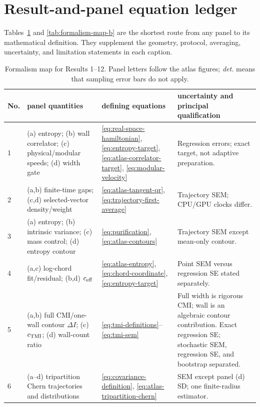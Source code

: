 \documentclass[aps,prb,twocolumn,floatfix,nofootinbib,superscriptaddress]{revtex4-2}
\begin{document}
\section{Result-and-panel equation ledger}
\label{app:equation-ledger}

Tables~\ref{tab:formalism-map-a} and \ref{tab:formalism-map-b} are the shortest route from
any panel to its mathematical definition.  They supplement the geometry, protocol,
averaging, uncertainty, and limitation statements in each caption.

\begin{table}[p]
\centering
\caption{\label{tab:formalism-map-a}Formalism map for Results 1--12.  Panel letters follow
the atlas figures; \emph{det.} means that sampling error bars do not apply.}
\footnotesize
\setlength{\tabcolsep}{3.2pt}
\renewcommand{\arraystretch}{1.08}
\begin{tabularx}{\textwidth}{p{}p{}Xp{}}
\toprule
No. & panel quantities & defining equations & uncertainty and principal qualification\\
\midrule
1 & (a) entropy; (b) wall correlator; (c) physical/modular speeds; (d) width gate
& \eqref{eq:real-space-hamiltonian}, \eqref{eq:entropy-target},
\eqref{eq:atlas-correlator-target}, \eqref{eq:modular-velocity}
& Regression errors; exact target, not adaptive preparation.\\
2 & (a,b) finite-time gaps; (c,d) selected-vector density/weight
& \eqref{eq:atlas-tangent-qr}, \eqref{eq:trajectory-first-average}
& Trajectory SEM; CPU/GPU clocks differ.\\
3 & (a) entropy; (b) intrinsic variance; (c) mass control; (d) entropy contour
& \eqref{eq:purification}, \eqref{eq:atlas-contours}
& Trajectory SEM except mean-only contour.\\
4 & (a,c) log-chord fit/residual; (b,d) $c_{\rm eff}$
& \eqref{eq:atlas-entropy}, \eqref{eq:chord-coordinate}, \eqref{eq:entropy-target}
& Point SEM versus regression SE stated separately.\\
5 & (a,b) full CMI/one-wall contour $\Delta I$; (c) $c_{\rm TMI}$; (d) wall-count ratio
& \eqref{eq:tmi-definitions}--\eqref{eq:tmi-sem}
& Full width is rigorous CMI; wall is an algebraic contour contribution.  Exact
regression SE; stochastic SEM, regression SE, and bootstrap separated.\\
6 & (a--d) tripartition Chern trajectories and distributions
& \eqref{eq:covariance-definition}, \eqref{eq:atlas-tripartition-chern}
& SEM except panel (d) SD; one finite-radius estimator.\\

\end{tabularx}
\end{table}
\end{document}
